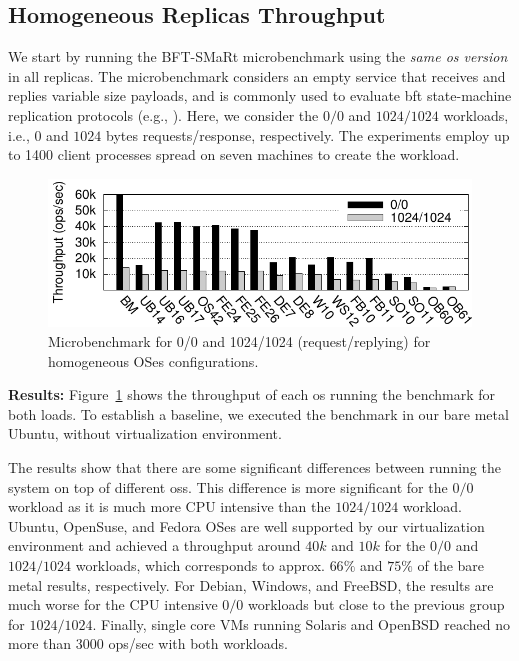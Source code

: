 


\subsection{Homogeneous Replicas Throughput}

We start by running the BFT-SMaRt microbenchmark using the \emph{same \gls{os} version} in all replicas.
The microbenchmark considers an empty service that receives and replies variable size payloads, and is commonly used to evaluate \gls{bft} state-machine replication protocols (e.g., \cite{Castro:1999,Bessani:2014,Liu:2016,Behl:2015,Behl:2017}). 
Here, we consider the $0/0$ and $1024/1024$ workloads, i.e., $0$ and $1024$ bytes requests/response, respectively.
The experiments employ up to 1400 client processes spread on seven machines to create the workload.

\begin{figure}[h]
\begin{center}
\includegraphics[width=\columnwidth]{images/gnuplot/vagrant/runs_new_new/throughput.pdf}
\caption{Microbenchmark for 0/0 and 1024/1024 (request/replying) for homogeneous OSes configurations.}
\label{fig:bftsmart}
\end{center}
\end{figure}


\textbf{Results:}
Figure~\ref{fig:bftsmart} shows the throughput of each \gls{os} running the benchmark for both loads.
To establish a baseline, we executed the benchmark in our bare metal Ubuntu, without \system virtualization environment.

The results show that there are some significant differences between running the system on top of different \glspl{os}.
This difference is more significant for the $0/0$ workload as it is much more CPU intensive than the $1024/1024$ workload.
Ubuntu, OpenSuse, and Fedora OSes are well supported by our virtualization environment and achieved a throughput around $40k$ and $10k$ for the $0/0$ and $1024/1024$ workloads, which corresponds to approx. $66\%$ and $75\%$ of the bare metal results, respectively.
For Debian, Windows, and FreeBSD, the results are much worse for the CPU intensive $0/0$ workloads but close to the previous group for $1024/1024$.
Finally, single core VMs running Solaris and OpenBSD reached no more than $3000$ ops/sec with both workloads.

